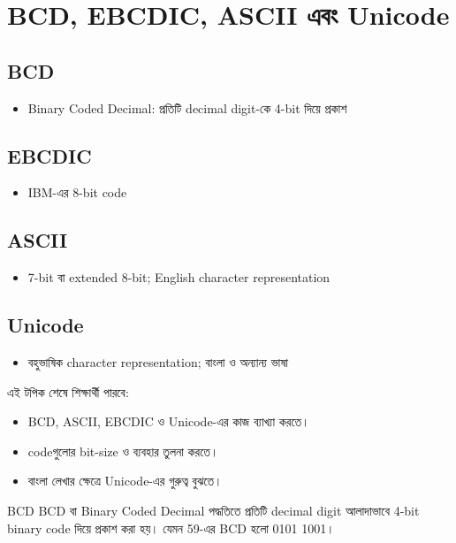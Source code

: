 \section{BCD, EBCDIC, ASCII এবং Unicode}

\subsection{BCD}
\begin{itemize}
\item Binary Coded Decimal: প্রতিটি decimal digit-কে 4-bit দিয়ে প্রকাশ
\end{itemize}

\subsection{EBCDIC}
\begin{itemize}
\item IBM-এর 8-bit code
\end{itemize}

\subsection{ASCII}
\begin{itemize}
\item 7-bit বা extended 8-bit; English character representation
\end{itemize}

\subsection{Unicode}
\begin{itemize}
\item বহুভাষিক character representation; বাংলা ও অন্যান্য ভাষা
\end{itemize}

\begin{learningbox}
এই টপিক শেষে শিক্ষার্থী পারবে:
\begin{itemize}
\item BCD, ASCII, EBCDIC ও Unicode-এর কাজ ব্যাখ্যা করতে।
\item codeগুলোর bit-size ও ব্যবহার তুলনা করতে।
\item বাংলা লেখার ক্ষেত্রে Unicode-এর গুরুত্ব বুঝতে।
\end{itemize}
\end{learningbox}

\begin{definitionbox}{BCD}
BCD বা Binary Coded Decimal পদ্ধতিতে প্রতিটি decimal digit আলাদাভাবে 4-bit binary code দিয়ে প্রকাশ করা হয়। যেমন 59-এর BCD হলো 0101 1001।
\end{definitionbox}

